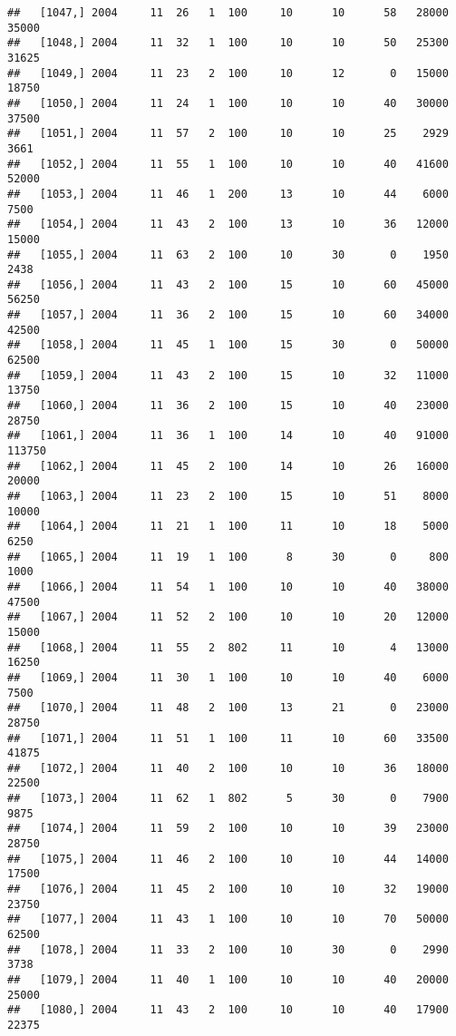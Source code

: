 \documentclass{article}\usepackage[]{graphicx}\usepackage[]{color}
\makeatletter
\newenvironment{kframe}{%
 \def\at@end@of@kframe{}%
 \ifinner\ifhmode%
  \def\at@end@of@kframe{\end{minipage}}%
  \begin{minipage}{\columnwidth}%
 \fi\fi%
 \def\FrameCommand##1{\hskip\@totalleftmargin \hskip-\fboxsep
 \colorbox{shadecolor}{##1}\hskip-\fboxsep
     \hskip-\linewidth \hskip-\@totalleftmargin \hskip\columnwidth}%
 \MakeFramed {\advance\hsize-\width
   \@totalleftmargin\z@ \linewidth\hsize
   \@setminipage}}%
 {\par\unskip\endMakeFramed%
 \at@end@of@kframe}
\newenvironment{knitrout}{}{} %
\makeatother
\begin{document}
\begin{knitrout}
\begin{kframe}
\begin{verbatim}
##   [1047,] 2004     11  26   1  100     10      10      58   28000   35000
##   [1048,] 2004     11  32   1  100     10      10      50   25300   31625
##   [1049,] 2004     11  23   2  100     10      12       0   15000   18750
##   [1050,] 2004     11  24   1  100     10      10      40   30000   37500
##   [1051,] 2004     11  57   2  100     10      10      25    2929    3661
##   [1052,] 2004     11  55   1  100     10      10      40   41600   52000
##   [1053,] 2004     11  46   1  200     13      10      44    6000    7500
##   [1054,] 2004     11  43   2  100     13      10      36   12000   15000
##   [1055,] 2004     11  63   2  100     10      30       0    1950    2438
##   [1056,] 2004     11  43   2  100     15      10      60   45000   56250
##   [1057,] 2004     11  36   2  100     15      10      60   34000   42500
##   [1058,] 2004     11  45   1  100     15      30       0   50000   62500
##   [1059,] 2004     11  43   2  100     15      10      32   11000   13750
##   [1060,] 2004     11  36   2  100     15      10      40   23000   28750
##   [1061,] 2004     11  36   1  100     14      10      40   91000  113750
##   [1062,] 2004     11  45   2  100     14      10      26   16000   20000
##   [1063,] 2004     11  23   2  100     15      10      51    8000   10000
##   [1064,] 2004     11  21   1  100     11      10      18    5000    6250
##   [1065,] 2004     11  19   1  100      8      30       0     800    1000
##   [1066,] 2004     11  54   1  100     10      10      40   38000   47500
##   [1067,] 2004     11  52   2  100     10      10      20   12000   15000
##   [1068,] 2004     11  55   2  802     11      10       4   13000   16250
##   [1069,] 2004     11  30   1  100     10      10      40    6000    7500
##   [1070,] 2004     11  48   2  100     13      21       0   23000   28750
##   [1071,] 2004     11  51   1  100     11      10      60   33500   41875
##   [1072,] 2004     11  40   2  100     10      10      36   18000   22500
##   [1073,] 2004     11  62   1  802      5      30       0    7900    9875
##   [1074,] 2004     11  59   2  100     10      10      39   23000   28750
##   [1075,] 2004     11  46   2  100     10      10      44   14000   17500
##   [1076,] 2004     11  45   2  100     10      10      32   19000   23750
##   [1077,] 2004     11  43   1  100     10      10      70   50000   62500
##   [1078,] 2004     11  33   2  100     10      30       0    2990    3738
##   [1079,] 2004     11  40   1  100     10      10      40   20000   25000
##   [1080,] 2004     11  43   2  100     10      10      40   17900   22375

\end{verbatim}
\end{kframe}
\end{knitrout}
\end{document}
